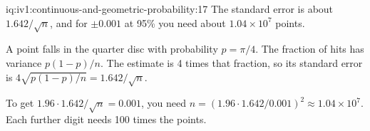 \begin{solution}{iq:iv1:continuous-and-geometric-probability:17}
The standard error is about $1.642/\sqrt{n}$, and for $\pm 0.001$ at 95\% you need about $1.04 \times 10^7$ points.

A point falls in the quarter disc with probability $p = \pi/4$. The fraction of hits has variance $p(1 - p)/n$. The estimate is 4 times that fraction, so its standard error is $4\sqrt{p(1 - p)/n} = 1.642/\sqrt{n}$.

To get $1.96 \cdot 1.642/\sqrt{n} = 0.001$, you need $n = (1.96 \cdot 1.642/0.001)^2 \approx 1.04 \times 10^7$. Each further digit needs 100 times the points.

\end{solution}

